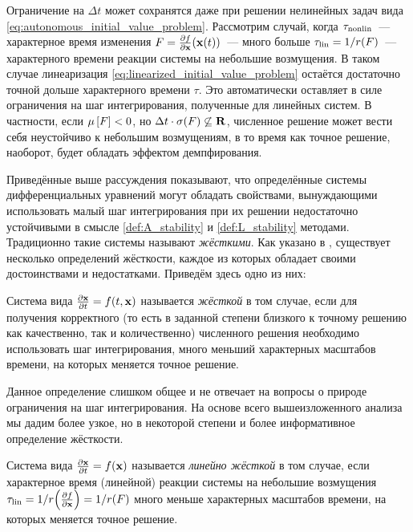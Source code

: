 Ограничение на $ \Delta t $ может сохранятся даже при решении нелинейных задач вида \eqref{eq:autonomous_initial_value_problem}.
Рассмотрим случай, когда $ \tau_{\textnormal{nonlin}} $~--- характерное время изменения $ F = \frac{\partial f}{\partial \mathbf{x}}(\mathbf{x}(t)) $~---
много больше $ \tau_{\textnormal{lin}} = 1/r(F) $~--- характерного времени реакции системы на небольшие возмущения.
В таком случае линеаризация \eqref{eq:linearized_initial_value_problem} остаётся достаточно точной дольше характерного времени $ \tau $.
Это автоматически оставляет в силе ограничения на шаг интегрирования, полученные для линейных систем.
В частности, если $ \mu \left[ F \right] < 0 $, но $ \Delta t \cdot \sigma(F) \not\subseteq \mathbf{R} $, численное решение может вести себя неустойчиво к небольшим возмущениям,
в то время как точное решение, наоборот, будет обладать эффектом демпфирования.

Приведённые выше рассуждения показывают, что определённые системы дифференциальных уравнений могут обладать свойствами,
вынуждающими использовать малый шаг интегрирования при их решении недостаточно устойчивыми в смысле \ref{def:A_stability} и \ref{def:L_stability} методами.
Традиционно такие системы называют \emph{жёсткими}.
Как указано в \cite{heirer1999solvingode2, lambert1991methods}, существует несколько определений жёсткости,
каждое из которых обладает своими достоинствами и недостатками.
Приведём здесь одно из них:

\begin{definition}
    \label{def:stiffness}
    Система вида $ \frac{\partial \mathbf{x}}{\partial t} = f(t, \mathbf{x}) $ называется \emph{жёсткой} в том случае,
    если для получения корректного (то есть в заданной степени близкого к точному решению как качественно, так и количественно)
    численного решения необходимо использовать шаг интегрирования,
    много меньший характерных масштабов времени, на которых меняется точное решение.
\end{definition}

Данное определение слишком общее и не отвечает на вопросы о природе ограничения на шаг интегрирования.
На основе всего вышеизложенного анализа мы дадим более узкое, но в некоторой степени и более информативное определение жёсткости.

\begin{definition}
    \label{def:linear_stiffness}
    Система вида $ \frac{\partial \mathbf{x}}{\partial t} = f(\mathbf{x}) $ называется \emph{линейно жёсткой} в том случае,
    если характерное время (линейной) реакции системы на небольшие возмущения $ \tau_{\textnormal{lin}} = 1 / r \! \left( \frac{\partial f}{\partial \mathbf{x}} \right) = 1 / r(F) $
    много меньше характерных масштабов времени, на которых меняется точное решение.
\end{definition}

